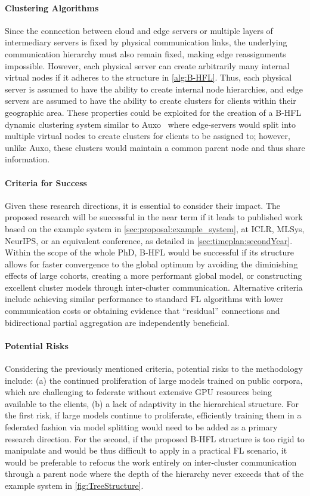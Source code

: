 \paragraph{Clustering Algorithms}  Since the connection between cloud and edge servers or multiple layers of intermediary servers is fixed by physical communication links, the underlying communication hierarchy must also remain fixed, making edge reassignments impossible. However, each physical server can create arbitrarily many internal virtual nodes if it adheres to the structure in \cref{alg:B-HFL}. Thus, each physical server is assumed to have the ability to create internal node hierarchies, and edge servers are assumed to have the ability to create clusters for clients within their geographic area. These properties could be exploited for the creation of a B-HFL dynamic clustering system similar to Auxo~\citep{Auxo} where edge-servers would split into multiple virtual nodes to create clusters for clients to be assigned to; however, unlike Auxo, these clusters would maintain a common parent node and thus share information.
\paragraph{Criteria for Success} Given these research directions, it is essential to consider their impact. The proposed research will be successful in the near term if it leads to published work based on the example system in \cref{sec:proposal:example_system}, at ICLR, MLSys, NeurIPS, or an equivalent conference, as detailed in \cref{sec:timeplan:secondYear}. Within the scope of the whole PhD, B-HFL would be successful if its structure allows for faster convergence to the global optimum by avoiding the diminishing effects of large cohorts, creating a more performant global model, or constructing excellent cluster models through inter-cluster communication. Alternative criteria include achieving similar performance to standard FL algorithms with lower communication costs or obtaining evidence that ``residual'' connections and bidirectional partial aggregation are independently beneficial.
\paragraph{Potential Risks} Considering the previously mentioned criteria, potential risks to the methodology include: (a) the continued proliferation of large models trained on public corpora, which are challenging to federate without extensive GPU resources being available to the clients, (b) a lack of adaptivity in the hierarchical structure. For the first risk, if large models continue to proliferate, efficiently training them in a federated fashion via model splitting would need to be added as a primary research direction. For the second, if the proposed B-HFL structure is too rigid to manipulate and would be thus difficult to apply in a practical FL scenario, it would be preferable to refocus the work entirely on inter-cluster communication through a parent node where the depth of the hierarchy never exceeds that of the example system in \cref{fig:TreeStructure}.



